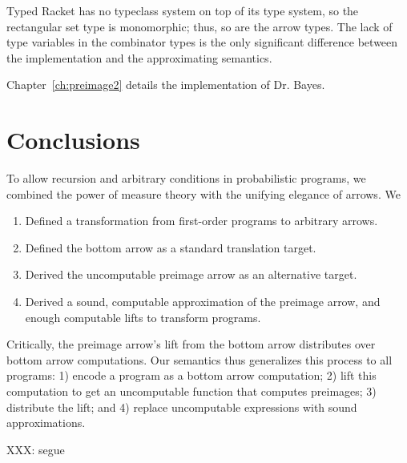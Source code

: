 Typed Racket has no typeclass system on top of its type system, so the rectangular set type is monomorphic; thus, so are the arrow types.
The lack of type variables in the combinator types is the only significant difference between the implementation and the approximating semantics.

Chapter~\ref{ch:preimage2} details the implementation of Dr. Bayes.

\section{Conclusions}

To allow recursion and arbitrary conditions in probabilistic programs, we combined the power of measure theory with the unifying elegance of arrows. We
\begin{enumerate}
	\item Defined a transformation from first-order programs to arbitrary arrows.
	\item Defined the bottom arrow as a standard translation target.
	\item Derived the uncomputable preimage arrow as an alternative target.
	\item Derived a sound, computable approximation of the preimage arrow, and enough computable lifts to transform programs.
\end{enumerate}
Critically, the preimage arrow's lift from the bottom arrow distributes over bottom arrow computations.
Our semantics thus generalizes this process to all programs: 1) encode a program as a bottom arrow computation; 2) lift this computation to get an uncomputable function that computes preimages; 3) distribute the lift; and 4) replace uncomputable expressions with sound approximations.

XXX: segue

